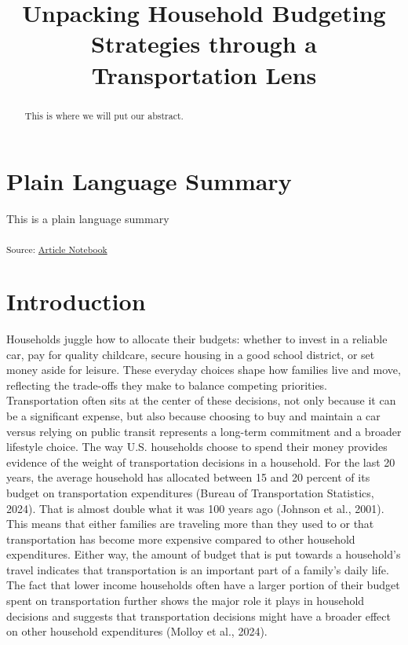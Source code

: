 \documentclass[
]{agujournal2019}
\begin{document}
\title{Unpacking Household Budgeting Strategies through a Transportation
Lens}



\begin{abstract}
This is where we will put our abstract.
\end{abstract}

\section*{Plain Language Summary}
This is a plain language summary




\textsubscript{Source:
\href{https://KamrynMansfield.github.io/transpo_budget_ces/index.qmd.html}{Article
Notebook}}

\section{Introduction}\label{introduction}

Households juggle how to allocate their budgets: whether to invest in a
reliable car, pay for quality childcare, secure housing in a good school
district, or set money aside for leisure. These everyday choices shape
how families live and move, reflecting the trade-offs they make to
balance competing priorities. Transportation often sits at the center of
these decisions, not only because it can be a significant expense, but
also because choosing to buy and maintain a car versus relying on public
transit represents a long-term commitment and a broader lifestyle
choice. The way U.S. households choose to spend their money provides
evidence of the weight of transportation decisions in a household. For
the last 20 years, the average household has allocated between 15 and 20
percent of its budget on transportation expenditures (Bureau of
Transportation Statistics, 2024). That is almost double what it was 100
years ago (Johnson et al., 2001). This means that either families are
traveling more than they used to or that transportation has become more
expensive compared to other household expenditures. Either way, the
amount of budget that is put towards a household's travel indicates that
transportation is an important part of a family's daily life. The fact
that lower income households often have a larger portion of their budget
spent on transportation further shows the major role it plays in
household decisions and suggests that transportation decisions might
have a broader effect on other household expenditures (Molloy et al.,
2024).
\end{document}
